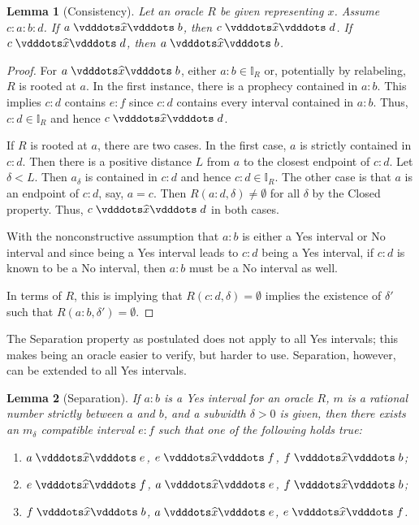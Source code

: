 \documentclass[12pt]{article}
\newtheorem{lemma}{Lemma}[section]
\begin{document}
\begin{lemma}[Consistency]\label{os:con}
    Let an oracle $R$ be given representing $x$. Assume $c:a:b:d$. If $a \xora b$, then $c \xora d$. If \sout{$c \xora d$}, then \sout{$a \xora b$}. 
\end{lemma}

\begin{proof}
    For $a \xora b$, either $a:b \in \mathbb{I}_R$ or, potentially by relabeling, $R$ is rooted at $a$. In the first instance, there is a prophecy contained in $a:b$. This implies $c:d$ contains $e:f$ since $c:d$ contains every interval contained in $a:b$. Thus, $c:d \in \mathbb{I}_R$ and hence $c \xora d$. 
    
    If $R$ is rooted at $a$, there are two cases. In the first case, $a$ is strictly contained in $c:d$. Then there is a positive distance $L$ from $a$ to the closest endpoint of $c:d$. Let $\delta < L$. Then $a_\delta$ is contained in $c:d$ and hence $c:d \in \mathbb{I}_R$. The other case is that $a$ is an endpoint of $c:d$, say, $ a= c$. Then $R(a:d, \delta) \neq \emptyset$ for all $\delta$ by the Closed property. Thus, $c \xora d$ in both cases.  

    With the nonconstructive assumption that $a:b$ is either a Yes interval or No interval and since being a Yes interval leads to $c:d$ being a Yes interval, if $c:d$ is known to be a No interval, then $a:b$ must be a No interval as well. 

    In terms of $R$, this is implying that $R(c:d, \delta) = \emptyset$ implies the existence of $\delta'$ such that $R(a:b, \delta') = \emptyset$. 
    
    
\end{proof}

The Separation property as postulated does not apply to all Yes intervals; this makes being an oracle easier to verify, but harder to use. Separation, however, can be extended to all Yes intervals.

\begin{lemma}[Separation]
    If $a: b$ is a Yes interval for an oracle $R$, $m$ is a rational number strictly between $a$ and $b$, and a subwidth $\delta > 0$ is given, then there exists an $m_\delta$ compatible interval $e:f$ such that one of the following holds true:
    \begin{enumerate}
        \item $a \xora e$, \sout{$e\xora f$}, \sout{$f\xora b$};
        \item $e \xora f$, \sout{$a\xora e$}, \sout{$f\xora b$};
        \item $f \xora b$, \sout{$a\xora e$}, \sout{$e\xora f$}.
    \end{enumerate}
\end{lemma}
\end{document}
